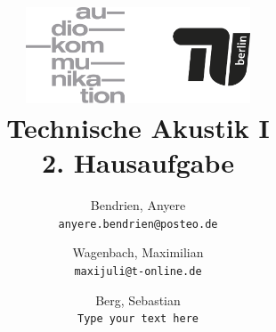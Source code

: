 





\title{
    \includegraphics[width=0.5\textwidth]{fig/audiokommtu-01.png}\\
    Technische Akustik I\\
    2. Hausaufgabe
}
\author
{
Bendrien, Anyere \\
\small\texttt{anyere.bendrien@posteo.de}
\and
Wagenbach, Maximilian \\
\small\texttt{maxijuli@t-online.de}
\and
Berg, Sebastian \\
\small\texttt{Type your text here}
}

\maketitle



